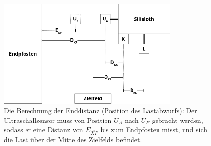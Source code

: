 \begin{figure}[H]
    \centering
    \includegraphics[width=0.8\textwidth]{graphs/enddistanz.png}
    \caption{Die Berechnung der Enddistanz (Position des Lastabwurfs): Der Ultraschallsensor muss von Position $U_{A}$ nach $U_{E}$ gebracht werden, sodass er eine Distanz von $E_{\overline{XP}}$ bis zum Endpfosten misst, und sich die Last über der Mitte des Zielfelds befindet.}
    \label{fig:enddistanz}
\end{figure}

